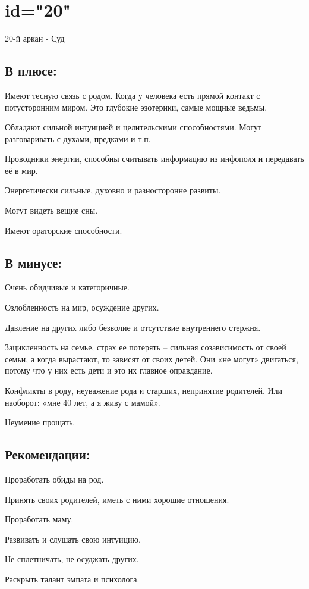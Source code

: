 \endsection

\section{id="20"}{20-й аркан - Суд}

\subsection{В плюсе:}
\item Имеют тесную связь с родом. Когда у человека есть прямой контакт с потусторонним миром. Это глубокие эзотерики, самые мощные ведьмы.
\item Обладают сильной интуицией и целительскими способностями. Могут разговаривать с духами, предками и т.п.
\item Проводники энергии, способны считывать информацию из инфополя и передавать её в мир.
\item Энергетически сильные, духовно и разносторонне развиты.
\item Могут видеть вещие сны.
\item Имеют ораторские способности.
\endsubsection

\subsection{В минусе:}
\item Очень обидчивые и категоричные.
\item Озлобленность на мир, осуждение других.
\item Давление на других либо безволие и отсутствие внутреннего стержня.
\item Зацикленность на семье, страх ее потерять – сильная созависимость от своей семьи, а когда вырастают, то зависят от своих детей. Они «не могут» двигаться, потому что у них есть дети и это их главное оправдание.
\item Конфликты в роду, неуважение рода и старших, непринятие родителей. Или наоборот: «мне 40 лет, а я живу с мамой».
\item Неумение прощать.
\endsubsection

\subsection{Рекомендации:}
\item Проработать обиды на род.
\item Принять своих родителей, иметь с ними хорошие отношения.
\item Проработать маму.
\item Развивать и слушать свою интуицию.
\item Не сплетничать, не осуджать других.
\item Раскрыть талант эмпата и психолога.
\endsubsection

